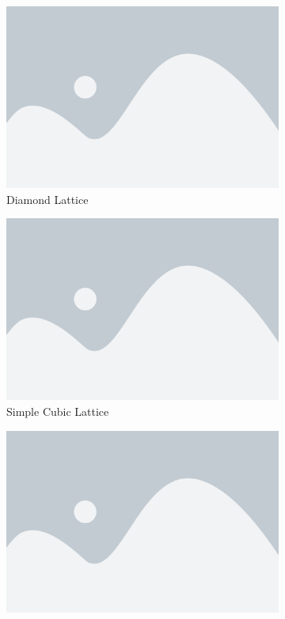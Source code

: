 \begin{figure}[p]
  \centering
  \begin{subfigure}[b]{0.45\textwidth}
    \centering
    \includegraphics[width=\textwidth]{placeholder}
    \caption{Diamond Lattice}
    \label{fig:diamond lattice}
  \end{subfigure}
  \hfill
  \begin{subfigure}[b]{0.45\textwidth}
    \centering
    \includegraphics[width=\textwidth]{placeholder}
    \caption{Simple Cubic Lattice}
    \label{fig:simple cubic lattice}
  \end{subfigure}
  \hfill
  \begin{subfigure}[b]{0.45\textwidth}
    \centering
    \includegraphics[width=\textwidth]{placeholder}

\end{subfigure}
\end{figure}
